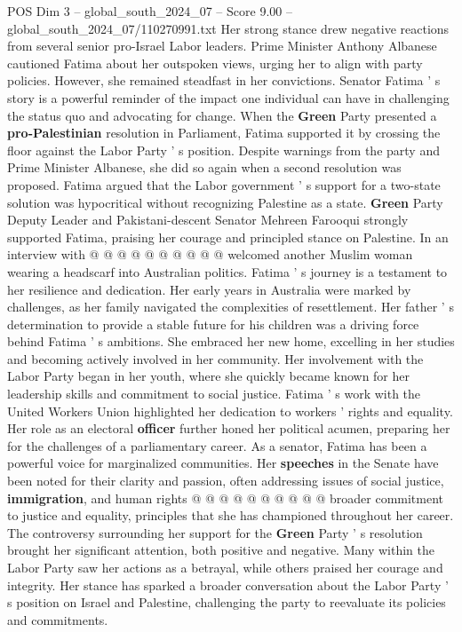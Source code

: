 \begin{textsample}{POS Dim 3 – global\_south\_2024\_07 – Score 9.00 – global\_south\_2024\_07/110270991.txt}
Her strong stance drew negative reactions from several senior pro-Israel Labor leaders.
Prime Minister Anthony Albanese cautioned Fatima about her outspoken views, urging her to align with party policies.
However, she remained steadfast in her convictions.
Senator Fatima ' s story is a powerful reminder of the impact one individual can have in challenging the status quo and advocating for change.
When the \textbf{Green} Party presented a \textbf{pro-Palestinian} resolution in Parliament, Fatima supported it by crossing the floor against the Labor Party ' s position.
Despite warnings from the party and Prime Minister Albanese, she did so again when a second resolution was proposed.
Fatima argued that the Labor government ' s support for a two-state solution was hypocritical without recognizing Palestine as a state. \textbf{Green} Party Deputy Leader and Pakistani-descent Senator Mehreen Farooqui strongly supported Fatima, praising her courage and principled stance on Palestine.
In an interview with @ @ @ @ @ @ @ @ @ @ welcomed another Muslim woman wearing a headscarf into Australian politics.
Fatima ' s journey is a testament to her resilience and dedication.
Her early years in Australia were marked by challenges, as her family navigated the complexities of resettlement.
Her father ' s determination to provide a stable future for his children was a driving force behind Fatima ' s ambitions.
She embraced her new home, excelling in her studies and becoming actively involved in her community.
Her involvement with the Labor Party began in her youth, where she quickly became known for her leadership skills and commitment to social justice.
Fatima ' s work with the United Workers Union highlighted her dedication to workers ' rights and equality.
Her role as an electoral \textbf{officer} further honed her political acumen, preparing her for the challenges of a parliamentary career.
As a senator, Fatima has been a powerful voice for marginalized communities.
Her \textbf{speeches} in the Senate have been noted for their clarity and passion, often addressing issues of social justice, \textbf{immigration}, and human rights @ @ @ @ @ @ @ @ @ @ broader commitment to justice and equality, principles that she has championed throughout her career.
The controversy surrounding her support for the \textbf{Green} Party ' s resolution brought her significant attention, both positive and negative.
Many within the Labor Party saw her actions as a betrayal, while others praised her courage and integrity.
Her stance has sparked a broader conversation about the Labor Party ' s position on Israel and Palestine, challenging the party to reevaluate its policies and commitments.

\end{textsample}
